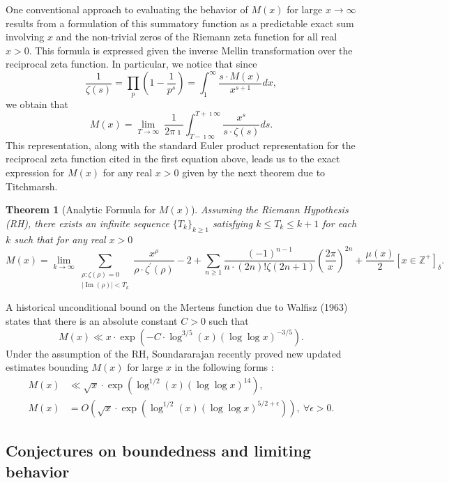 \documentclass[11pt,reqno,a4letter]{article}
\numberwithin{figure}{section}
\numberwithin{table}{section}
\newcommand{\Iverson}[1]{\ensuremath{\left[#1\right]_{\delta}}}
\theoremstyle{plain}
\newtheorem{theorem}{Theorem}
\numberwithin{theorem}{section}
\theoremstyle{definition}
\renewcommand{\Im}{\operatorname{Im}}
\begin{document}
One conventional approach to evaluating the behavior of $M(x)$ for large 
$x \rightarrow \infty$ results from a formulation of this summatory 
function as a predictable exact sum involving $x$ and the non-trivial 
zeros of the Riemann zeta function for all real $x > 0$. 
This formula is expressed given the inverse Mellin transformation 
over the reciprocal zeta function. In particular, 
we notice that since 
\[
\frac{1}{\zeta(s)} = \prod_{p} \left(1 - \frac{1}{p^s}\right) = 
     \int_1^{\infty} \frac{s \cdot M(x)}{x^{s+1}} dx, 
\]
we obtain that 
\[
M(x) = \lim_{T \rightarrow \infty}\ \frac{1}{2\pi\imath} \int_{T-\imath\infty}^{T+\imath\infty} 
     \frac{x^s}{s \cdot \zeta(s)} ds. 
\] 
This representation, along with the standard Euler product 
representation for the reciprocal zeta function cited in the first equation above, leads us to the 
exact expression for $M(x)$ for any real $x > 0$ 
given by the next theorem due to Titchmarsh. 
\nocite{TITCHMARSH} 

\begin{theorem}[Analytic Formula for $M(x)$] 
\label{theorem_MxMellinTransformInvFormula} 
Assuming the Riemann Hypothesis (RH), there exists an infinite sequence 
$\{T_k\}_{k \geq 1}$ satisfying $k \leq T_k \leq k+1$ for each $k$ 
such that for any real $x > 0$ 
\[
M(x) = \lim_{k \rightarrow \infty} 
     \sum_{\substack{\rho: \zeta(\rho) = 0 \\ |\Im(\rho)| < T_k}} 
     \frac{x^{\rho}}{\rho \cdot \zeta^{\prime}(\rho)} - 2 + 
     \sum_{n \geq 1} \frac{(-1)^{n-1}}{n \cdot (2n)! \zeta(2n+1)} 
     \left(\frac{2\pi}{x}\right)^{2n} + 
     \frac{\mu(x)}{2} \Iverson{x \in \mathbb{Z}^{+}}. 
\] 
\end{theorem} 

A historical unconditional bound on the Mertens function due to Walfisz (1963) 
states that there is an absolute constant $C > 0$ such that 
$$M(x) \ll x \cdot \exp\left(-C \cdot \log^{3/5}(x) 
  (\log\log x)^{-3/5}\right).$$ 
Under the assumption of the RH, Soundararajan recently proved new updated estimates 
bounding $M(x)$ for large $x$ in the following forms \cite{SOUND-MERTENS-ANNALS}: 
\begin{align*} 
M(x) & \ll \sqrt{x} \cdot \exp\left(\log^{1/2}(x) (\log\log x)^{14}\right), \\ 
M(x) & = O\left(\sqrt{x} \cdot \exp\left( 
     \log^{1/2}(x) (\log\log x)^{5/2+\epsilon}\right)\right),\ 
     \forall \epsilon > 0. 
\end{align*} 

\subsection{Conjectures on boundedness and limiting behavior} 
\end{document}
